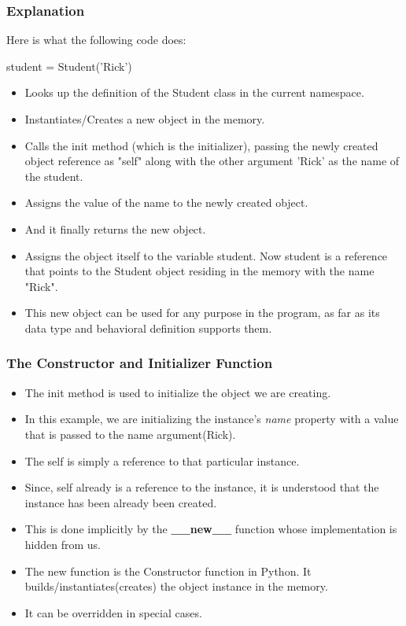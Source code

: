 \documentclass{beamer}
\begin{document}
\begin{frame}
\frametitle{Explanation}
Here is what the following code does:

student = Student('Rick')
\begin{itemize}
\item Looks up the definition of the Student class in the current namespace.
\item Instantiates/Creates a new object in the memory.
\item Calls the init method (which is the initializer), passing the newly created object reference as "self" along with the other argument 'Rick' as the name of the student.
\item Assigns the value of the name to the newly created object.
\item And it finally returns the new object.
\item Assigns the object itself to the variable student. Now student is a reference that points to the Student object residing in the memory with the name "Rick".
\item This new object can be used for any purpose in the program, as far as its data type and behavioral definition supports them.
\end{itemize}
\end{frame}


\begin{frame}
\frametitle{The Constructor and Initializer Function}
\begin{itemize}
\item The init method is used to initialize the object we are creating.
\item In this example, we are initializing the  instance's \textit{name} property with a value that is passed to the name argument(Rick).
\item The self is simply a reference to that particular instance.
\item Since, self already is a reference to the instance, it is understood that the instance has been already been created.
\item This is done implicitly by the \textbf{\_\_new\_\_} function whose implementation is hidden from us. 
\item The new function is the Constructor function in Python. It builds/instantiates(creates) the object instance in the memory.
\item It can be overridden in special cases.
\end{itemize}
\end{frame}
\end{document}
